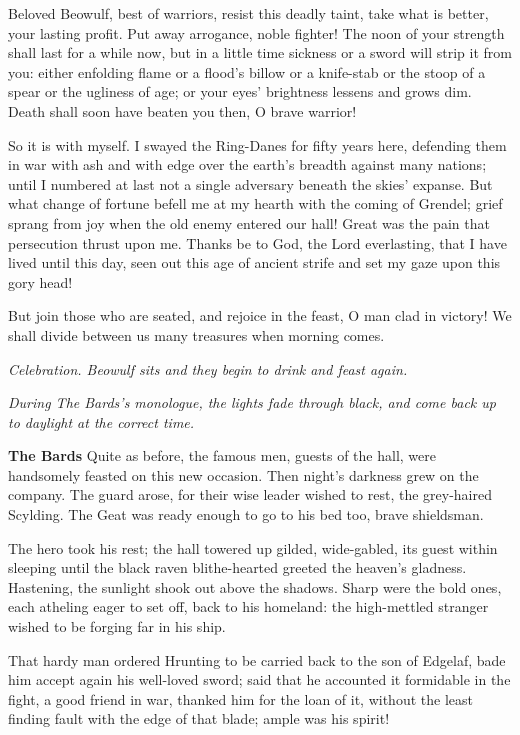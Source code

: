 \documentclass[a4paper]{article}
\begin{document}
{Beloved Beowulf, best of warriors,
resist this deadly taint, take what is better,
your lasting profit. Put away arrogance,
noble fighter! The noon of your strength
shall last for a while now, but in a little time
sickness or a sword will strip it from you:
either enfolding flame or a flood’s billow
or a knife-stab or the stoop of a spear
or the ugliness of age; or your eyes’ brightness
lessens and grows dim. Death shall soon
have beaten you then, O brave warrior!

So it is with myself. I swayed the Ring-Danes
for fifty years here, defending them in war
with ash and with edge over the earth’s breadth
against many nations; until I numbered at last
not a single adversary beneath the skies’ expanse.
But what change of fortune befell me at my hearth
with the coming of Grendel; grief sprang from joy
when the old enemy entered our hall!
Great was the pain that persecution
thrust upon me. Thanks be to God,
the Lord everlasting, that I have lived until this day,
seen out this age of ancient strife
and set my gaze upon this gory head!

But join those who are seated, and rejoice in the feast,
O man clad in victory! We shall divide between us
many treasures when morning comes.

\centerline{\textit{Celebration. Beowulf sits and they begin to drink and feast again.}}

\centerline{\textit{During The Bards's monologue, the lights fade through black, and come back up to daylight at the correct time.}}

\textbf{The Bards} Quite as before, the famous men,
guests of the hall, were handsomely feasted
on this new occasion. Then night’s darkness
grew on the company. The guard arose,
for their wise leader wished to rest,
the grey-haired Scylding. The Geat was ready enough
to go to his bed too, brave shieldsman.

The hero took his rest; the hall towered up
gilded, wide-gabled, its guest within sleeping
until the black raven blithe-hearted greeted
the heaven’s gladness. Hastening, the sunlight
shook out above the shadows. Sharp were the bold ones,
each atheling eager to set off,
back to his homeland: the high-mettled stranger
wished to be forging far in his ship.

That hardy man ordered Hrunting to be carried
back to the son of Edgelaf, bade him accept again
his well-loved sword; said that he accounted it
formidable in the fight, a good friend in war,
thanked him for the loan of it, without the least finding fault
with the edge of that blade; ample was his spirit!

}
\end{document}
